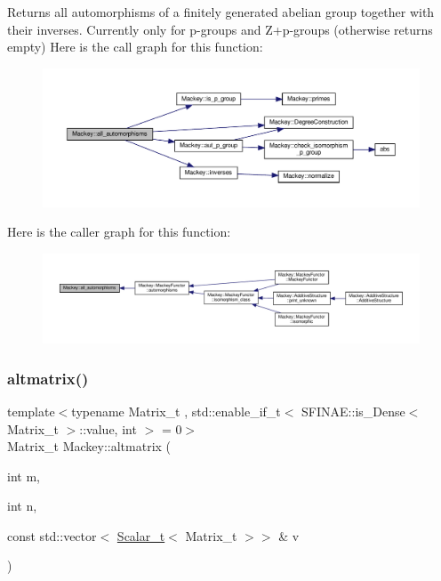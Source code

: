 Returns all automorphisms of a finitely generated abelian group together with their inverses. Currently only for p-\/groups and Z+p-\/groups (otherwise returns empty) Here is the call graph for this function\+:\nopagebreak
\begin{figure}[H]
\begin{center}
\leavevmode
\includegraphics[width=350pt]{namespaceMackey_a2556e2a1f78783585df78de1c1b35eae_cgraph}
\end{center}
\end{figure}
Here is the caller graph for this function\+:\nopagebreak
\begin{figure}[H]
\begin{center}
\leavevmode
\includegraphics[width=350pt]{namespaceMackey_a2556e2a1f78783585df78de1c1b35eae_icgraph}
\end{center}
\end{figure}
\mbox{\label{namespaceMackey_aa2f105c9bcbec7f5c7524027174340a0}} 
\subsubsection{\texorpdfstring{altmatrix()}{altmatrix()}}
{\footnotesize\ttfamily template$<$typename Matrix\+\_\+t , std\+::enable\+\_\+if\+\_\+t$<$ S\+F\+I\+N\+A\+E\+::is\+\_\+\+Dense$<$ Matrix\+\_\+t $>$\+::value, int $>$  = 0$>$ \\
Matrix\+\_\+t Mackey\+::altmatrix (\begin{DoxyParamCaption}\item[{int}]{m,  }\item[{int}]{n,  }\item[{const std\+::vector$<$ \hyperlink{namespaceMackey_a93ba297573961f91101fb84bc84bbe95}{Scalar\+\_\+t}$<$ Matrix\+\_\+t $>$$>$ \&}]{v }\end{DoxyParamCaption})}



